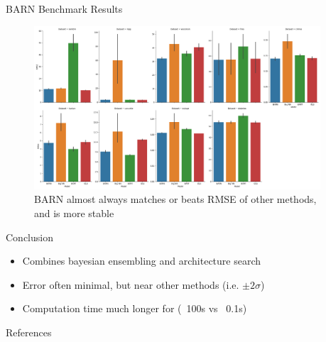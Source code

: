 \documentclass{beamer}
\newlength{\columnheight}
\begin{document}
\begin{frame}
\begin{columns}
\begin{column}{.33\textwidth}
	\end{column}
	\begin{column}{.33\textwidth}
	\begin{minipage}{.98\textwidth}  %
		\parbox[t][\columnheight]{\textwidth}{ %
		\begin{myblock}{BARN Benchmark Results}
\begin{figure}[h]
\centering
    \includegraphics[scale=.62]{pres_results.png}
    \caption{BARN almost always matches or beats RMSE of other methods, and is more stable}
    \label{fig:results}
\end{figure}
		\end{myblock}
			\begin{myblock}{Conclusion}
\begin{itemize}
\item Combines bayesian ensembling and architecture search
\item Error often minimal, but near other methods (i.e. $\pm 2\sigma$)
\item Computation time much longer for (~100s vs ~0.1s)
\end{itemize}
		\end{myblock}
		\begin{myblock}{References}
			\footnotesize
			
			
		\end{myblock}
		\vfill
		}
	\end{minipage}
	\end{column}
\end{columns}
\end{frame}
\end{document}
